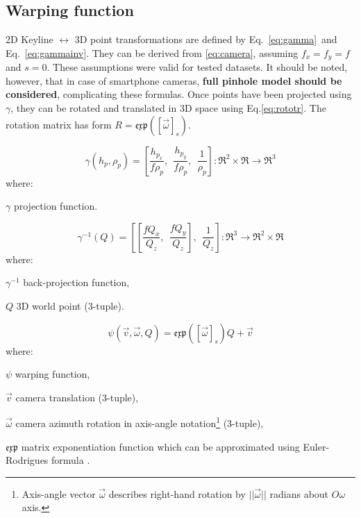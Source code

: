 \subsection{Warping function}
\label{sec:warp}

2D Keyline $\longleftrightarrow$ 3D point transformations are defined by Eq.~\ref{eq:gamma}~and Eq.~\ref{eq:gammainv}. They can be derived from \ref{eq:camera}, assuming $f_x = f_y = f$ and $s = 0$. These assumptions were valid for tested datasets. It should be noted, however, that in case of smartphone cameras, \textbf{full pinhole model should be considered}, complicating these formulas. Once points have been projected using $\gamma$, they can be rotated and translated in 3D space using Eq.\ref{eq:rototr}. The rotation matrix has form $R = \mathfrak{exp} \left ( \left[ \vec{\omega} \right ]_{s} \right )$.


\begin{equation}
\gamma(h_{p}, \rho_{p}) = \left [\frac{h_{p_x}}{f\rho_{p}},\ \ \frac{h_{p_y}}{f\rho_{p}},\ \ \frac{1}{\rho_{p}}\right ]: \Re^2 \times \Re \rightarrow \Re^3
\label{eq:gamma}
\end{equation}
where:
\begin{eqwhere}[2cm]
	\item[$\gamma$] projection function.
\end{eqwhere}

\begin{equation}
\gamma^{-1}(Q) = \left [ \left [ \frac{fQ_x}{Q_z},\ \ \frac{fQ_y}{Q_z} \right],\ \ \frac{1}{Q_{z}}\right ]: \Re^3 \rightarrow  \Re^2 \times \Re
\label{eq:gammainv}
\end{equation}
where:
\begin{eqwhere}[2cm]
	\item[$\gamma^{-1}$] back-projection function,
	\item[$Q$] 3D world point (3-tuple).
\end{eqwhere}

\begin{equation}
\psi(\vec{v}, \vec{\omega}, Q) = \mathfrak{exp} \left ( \left[ \vec{\omega} \right ]_{s} \right ) Q + \vec{v}
\label{eq:rototr}
\end{equation}
where:
\begin{eqwhere}[2cm]
	\item[$\psi$] warping function,
	\item[$\vec{v}$] camera translation (3-tuple),
	\item[$\vec{\omega}$] camera azimuth rotation in axis-angle notation\footnote{Axis-angle vector $\vec{\omega}$ describes right-hand rotation by $||\vec{\omega}||$ radians about $O\omega$ axis.} (3-tuple),
	\item[$ \mathfrak{exp}$] matrix exponentiation function which can be approximated using Euler-Rodrigues formula \cite{opencv}.
\end{eqwhere}



